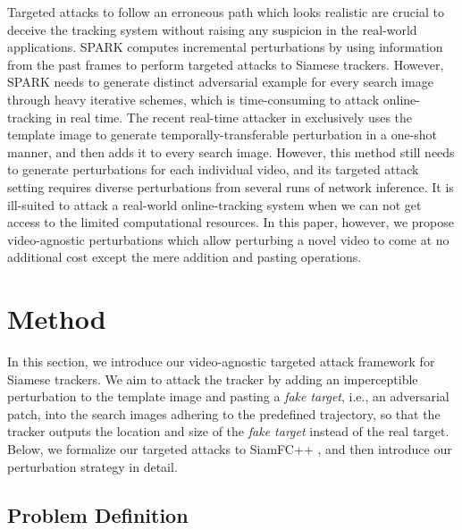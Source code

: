 \documentclass[journal]{IEEEtran}
\begin{document}
Targeted attacks to follow an erroneous path which looks realistic are crucial to deceive the tracking system without raising any suspicion in the real-world applications.
SPARK \cite{SPARK} computes incremental perturbations by using information from the past frames to perform targeted attacks to Siamese trackers. However, SPARK needs to generate distinct adversarial example for every search image through heavy iterative schemes, which is time-consuming to attack online-tracking in real time. The recent real-time attacker in \cite{TTP} exclusively uses the template image to generate temporally-transferable perturbation in a one-shot manner, and then adds it to every search image. However, this method still needs to generate perturbations for each individual video, and its targeted attack setting requires diverse perturbations from several runs of network inference. It is ill-suited to attack a real-world online-tracking system when we can not get access to the limited computational resources. In this paper, however, we propose video-agnostic perturbations which allow perturbing a novel video to come at no additional cost except the mere addition and pasting operations.

\section{Method}

In this section, we introduce our video-agnostic targeted attack framework for Siamese trackers. We aim to attack the tracker by adding an imperceptible perturbation to the template image and pasting a \textit{fake target}, i.e., an adversarial patch, into the search images adhering to the predefined trajectory, so that the tracker outputs the location and size of the \textit{fake target} instead of the real target. Below, we formalize our targeted attacks to SiamFC++ \cite{SiamFC++}, and then introduce our perturbation strategy in detail.
 
\subsection{Problem Definition}
\end{document}
